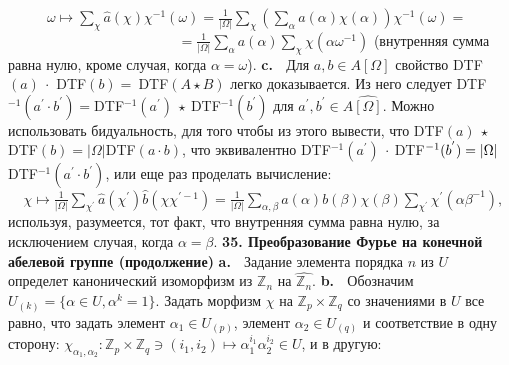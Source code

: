 \documentclass{../../template/mai_book}
\begin{document}
$\;\;\;\;\;\;\;\;\;\; \omega \longmapsto \sum \limits_{\chi} \hat a (\chi) \chi^{-1}(\omega) = \frac{1}{|\Omega|}\sum \limits_{\chi}(\sum \limits_{\alpha}a(\alpha)\chi(\alpha))\chi^{-1}(\omega) =$ \newline \indent
$\;\;\;\;\;\;\;\;\;\;\,\;\;\;\;\;\;\;\;\;\;\;\;\;\;\;\;\;\;\;\;\;\;\;\;\;\;\;\;\;\;\;\;\;= \frac{1}{|\Omega|}\sum \limits_{\alpha}a(\alpha)\sum \limits_{\chi}\chi(\alpha \omega^{-1})$ \newline \newline
(внутренняя сумма равна нулю, кроме случая, когда $\alpha = \omega$). \newline \newline \indent
\textbf{c.} $\;$ Для $a,b \in A[\Omega]$ свойство DTF$(a)\: \cdot $ DTF$(b) = \:$DTF$(A \star B)$ легко доказывается. Из него следует DTF$^{-1}(a^{'} \cdot b^{'}) = $DTF$^{-1}(a^{'}) \: \star \: $DTF$^{-1}(b^{'})$ для $a^{'},b^{'} \in A \widehat{[\Omega]}$. Можно использовать бидуальность, для того чтобы из этого вывести, что DTF$(a) \: \star \: $DTF$(b) = |\Omega|$DTF$(a \cdot b)$, что эквивалентно DTF$^{-1}(a^{'}) \: \cdot \: $DTF$^{-1}(b^{'}) = |\Omega| \\ $DTF$^{-1}(a^{'} \cdot b^{'})$, или еще раз проделать вычисление: \newline \newline \indent
$\;\;\;\; \chi \longmapsto \frac{1}{|\Omega|}\sum \limits_{\chi^{'}}\hat a (\chi^{'})\hat b (\chi \chi^{'-1}) = \frac{1}{|\Omega|}\sum \limits_{\alpha , \beta}a(\alpha)b(\beta)\chi (\beta)\sum \limits_{\chi^{'}}\chi^{'}(\alpha \beta^{-1}),$ \newline \newline\newline 
используя, разумеется, тот факт, что внутренняя сумма равна нулю, за исключением случая, когда $\alpha = \beta$. \newline \newline
\textbf{35.  Преобразование Фурье на конечной абелевой группе \newline \indent (продолжение)} \newline \newline \indent
\textbf{a.} $\;$ Задание элемента порядка $n$ из $U$ определет канонический изоморфизм из $\mathds{Z}_n$ на $\widehat{\mathds{Z}_n}$. \newline \newline \indent
\textbf{b.} $\;$ Обозначим $U_{(k)} = \{\alpha \in U, \alpha^{k} = 1\}$. Задать морфизм $\chi$ на $\mathds{Z}_p \times \mathds{Z}_q$ со значениями в $U$ все равно, что задать элемент $\alpha_1 \in U_{(p)}$, элемент $\alpha_2 \in U_{(q)}$ и соответствие в одну сторону: $\chi_{\alpha_1 , \alpha_2} : \mathds{Z}_p \times \mathds{Z}_q \ni (i_1 , i_2) \longmapsto \alpha_1^{i_1}\alpha_2^{i_2} \in U$, и в другую: \newline \newline \indent
\end{document}
